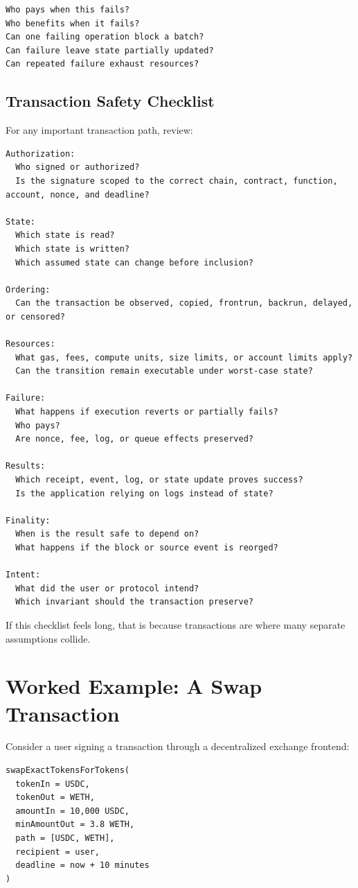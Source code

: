 \begin{lstlisting}
Who pays when this fails?
Who benefits when it fails?
Can one failing operation block a batch?
Can failure leave state partially updated?
Can repeated failure exhaust resources?
\end{lstlisting}

\subsection{Transaction Safety Checklist}

For any important transaction path, review:

\begin{lstlisting}
Authorization:
  Who signed or authorized?
  Is the signature scoped to the correct chain, contract, function, account, nonce, and deadline?

State:
  Which state is read?
  Which state is written?
  Which assumed state can change before inclusion?

Ordering:
  Can the transaction be observed, copied, frontrun, backrun, delayed, or censored?

Resources:
  What gas, fees, compute units, size limits, or account limits apply?
  Can the transition remain executable under worst-case state?

Failure:
  What happens if execution reverts or partially fails?
  Who pays?
  Are nonce, fee, log, or queue effects preserved?

Results:
  Which receipt, event, log, or state update proves success?
  Is the application relying on logs instead of state?

Finality:
  When is the result safe to depend on?
  What happens if the block or source event is reorged?

Intent:
  What did the user or protocol intend?
  Which invariant should the transaction preserve?
\end{lstlisting}

If this checklist feels long, that is because transactions are where
many separate assumptions collide.

\section{Worked Example: A Swap Transaction}

Consider a user signing a transaction through a decentralized exchange
frontend:

\begin{lstlisting}
swapExactTokensForTokens(
  tokenIn = USDC,
  tokenOut = WETH,
  amountIn = 10,000 USDC,
  minAmountOut = 3.8 WETH,
  path = [USDC, WETH],
  recipient = user,
  deadline = now + 10 minutes
)
\end{lstlisting}

